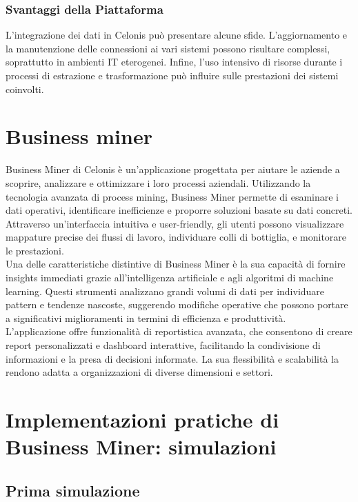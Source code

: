 \documentclass{article}
\begin{document}
\subsubsection{Svantaggi della Piattaforma}
L'integrazione dei dati in Celonis può presentare alcune sfide. L'aggiornamento e la manutenzione delle connessioni ai vari sistemi possono risultare complessi, soprattutto in ambienti IT eterogenei. Infine, l'uso intensivo di risorse durante i processi di estrazione e trasformazione può influire sulle prestazioni dei sistemi coinvolti.

\section{Business miner}
Business Miner di Celonis è un'applicazione progettata per aiutare le aziende a scoprire, analizzare e ottimizzare i loro processi aziendali. Utilizzando la tecnologia avanzata di process mining, Business Miner permette di esaminare i dati operativi, identificare inefficienze e proporre soluzioni basate su dati concreti.\\
Attraverso un'interfaccia intuitiva e user-friendly, gli utenti possono visualizzare mappature precise dei flussi di lavoro, individuare colli di bottiglia, e monitorare le prestazioni.\\
Una delle caratteristiche distintive di Business Miner è la sua capacità di fornire insights immediati grazie all'intelligenza artificiale e agli algoritmi di machine learning. Questi strumenti analizzano grandi volumi di dati per individuare pattern e tendenze nascoste, suggerendo modifiche operative che possono portare a significativi miglioramenti in termini di efficienza e produttività.\\
L'applicazione offre funzionalità di reportistica avanzata, che consentono di creare report personalizzati e dashboard interattive, facilitando la condivisione di informazioni e la presa di decisioni informate. La sua flessibilità e scalabilità la rendono adatta a organizzazioni di diverse dimensioni e settori.\\

\section{Implementazioni pratiche di Business Miner: simulazioni}

\subsection{Prima simulazione}
\end{document}
